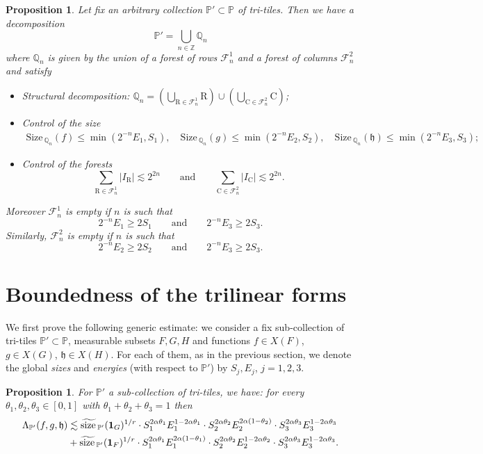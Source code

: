 \documentclass[a4paper,11pt,oneside]{amsart}
\newcommand{\hh}{\mathfrak{h}}
\newcommand{\PP}{\mathbb{P}}
\newcommand{\QQ}{\mathbb{Q}}
\newcommand{\FF}{\mathcal{F}}
\newcommand{\CC}{\mathrm{C}}
\newcommand{\RR}{\mathrm{R}}
\newcommand{\size}{\mathrm{Size\, }}
\newcommand{\ssize}{\widetilde{\mathrm{size}\,}}
\theoremstyle{plain}
\newtheorem{proposition}[theorem]{Proposition}
\theoremstyle{definition}
\begin{document}
\begin{proposition} \label{prop:decomposition} Let fix an arbitrary collection $\PP'\subset \PP$ of tri-tiles. Then we have a decomposition
$$  \PP'= \bigcup_{n\in{\mathbb Z}} \QQ_n$$
where $\QQ_{n}$ is given by the union of a forest of rows $\FF_{n}^{1}$ and a forest of columns $\FF_{n}^2$ and satisfy
\begin{itemize}
\item Structural decomposition: $\QQ_n = (\bigcup_{\RR \in \FF_n^1} \RR) \cup (\bigcup_{\CC \in \FF_n^2} \CC)$; 
\item Control of the size
\begin{align*}
\size_{\QQ_n}(f) \leq \min(2^{-n} E_1,S_1), \quad \size_{\QQ_n}(g) \leq \min(2^{-n} E_2,S_2), \quad \size_{\QQ_n}(\hh) \leq \min(2^{-n} E_3,S_3);
\end{align*}
\item Control of the forests
$$ \sum_{\RR\in\FF_{n}^1} |I_{\RR}|\lesssim 2^{2n} \qquad \textrm{and} \qquad \sum_{\CC\in\FF_{n}^2} |I_{\CC}|\lesssim 2^{2n}.$$
\end{itemize}
Moreover $\FF_{n}^1$ is empty if $n$ is such that
$$2^{-n} E_1 \geq 2 S_1 \qquad \textrm{and} \qquad 2^{-n} E_3 \geq 2 S_3.$$
Similarly, $\FF_{n}^2$ is empty if $n$ is such that
$$2^{-n} E_2 \geq 2 S_2 \qquad \textrm{and} \qquad 2^{-n} E_3 \geq 2 S_3.$$
\end{proposition}

\section{Boundedness of the trilinear forms}

We first prove the following generic estimate: we consider a fix sub-collection of tri-tiles $\PP'\subset \PP$, measurable subsets $F,G,H$ and functions $f\in X(F)$, $g\in X(G)$, $\hh\in X(H)$. For each of them, as in the previous section, we denote the global {\it sizes} and {\it energies} (with respect to $\PP'$) by $S_j,E_j$, $j=1,2,3$.

\begin{proposition} \label{prop:estimation} For $\PP'$ a sub-collection of tri-tiles, we have: for every $\theta_1,\theta_2,\theta_3\in[0,1]$ with $\theta_1+\theta_2+\theta_3=1$ then
\begin{align*}
 \Lambda_{\PP'}(f,g,\hh) & \lesssim \ssize_{\PP'}({\bf 1}_G)^{1/r} \cdot S_1^{2\alpha \theta_1} E_1^{1-2\alpha \theta_1} \cdot S_2^{2\alpha \theta_2} E_2^{2\alpha(1-\theta_2)} \cdot S_3^{2\alpha \theta_3} E_3^{1-2\alpha \theta_3} \\
 & + \ssize_{\PP'}({\bf 1}_F)^{1/r} \cdot S_1^{2\alpha \theta_1} E_1^{2\alpha(1-\theta_1)} \cdot S_2^{2\alpha \theta_2} E_2^{1-2\alpha \theta_2} \cdot S_3^{2\alpha \theta_3} E_3^{1-2\alpha \theta_3}.
 \end{align*}
\end{proposition}
\end{document}
